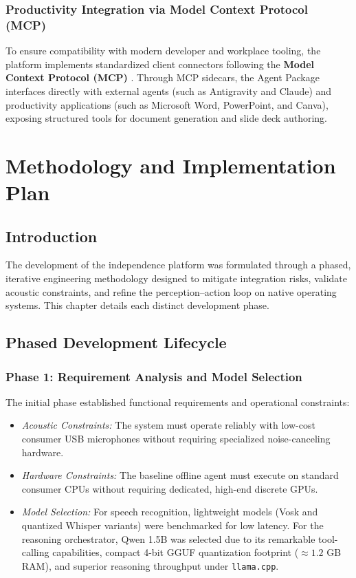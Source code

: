 \documentclass[12pt,a4paper]{report}
\begin{document}
\subsection{Productivity Integration via Model Context Protocol (MCP)}
To ensure compatibility with modern developer and workplace tooling, the platform implements standardized client connectors following the \textbf{Model Context Protocol (MCP)} \cite{anthropic2024mcp}. Through MCP sidecars, the Agent Package interfaces directly with external agents (such as Antigravity and Claude) and productivity applications (such as Microsoft Word, PowerPoint, and Canva), exposing structured tools for document generation and slide deck authoring.


\chapter{Methodology and Implementation Plan}
\label{chap:methodology}

\section{Introduction}
The development of the independence platform was formulated through a phased, iterative engineering methodology designed to mitigate integration risks, validate acoustic constraints, and refine the perception--action loop on native operating systems. This chapter details each distinct development phase.

\section{Phased Development Lifecycle}

\subsection{Phase 1: Requirement Analysis and Model Selection}
The initial phase established functional requirements and operational constraints:
\begin{itemize}
    \item \textit{Acoustic Constraints:} The system must operate reliably with low-cost consumer USB microphones without requiring specialized noise-canceling hardware.
    \item \textit{Hardware Constraints:} The baseline offline agent must execute on standard consumer CPUs without requiring dedicated, high-end discrete GPUs.
    \item \textit{Model Selection:} For speech recognition, lightweight models (Vosk and quantized Whisper variants) were benchmarked for low latency. For the reasoning orchestrator, Qwen 1.5B was selected due to its remarkable tool-calling capabilities, compact 4-bit GGUF quantization footprint ($\approx 1.2$ GB RAM), and superior reasoning throughput under \texttt{llama.cpp}.
\end{itemize}
\end{document}
